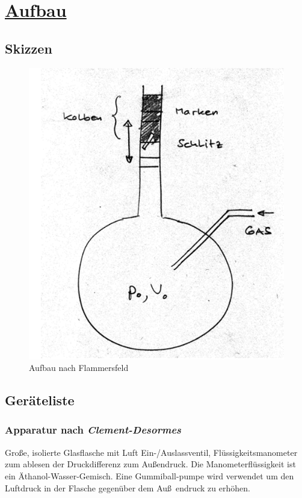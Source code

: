 \documentclass[11pt,a4paper]{article}
\begin{document}
  \section{\underline{Aufbau}}
  \subsection{Skizzen}
  \begin{figure}
      \caption{Aufbau nach Flammersfeld}
      \includegraphics{skizzeIsentropenindex.png}
  \end{figure}
  \subsection{Ger\"ateliste}
  \subsubsection{Apparatur nach \itshape{Clement-Desormes}\/}
  Gro{\ss}e, isolierte Glasflasche mit Luft Ein-/Auslassventil,
  Fl\"ussigkeitsmanometer zum ablesen der Druckdifferenz zum Au{\ss}endruck. Die 
  Manometerfl\"ussigkeit ist ein \"Athanol-Wasser-Gemisch. Eine Gummiball-pumpe
  wird verwendet um den Luftdruck in der Flasche gegen\"uber dem Au\ss~endruck zu 
  erh\"ohen.
\end{document}
